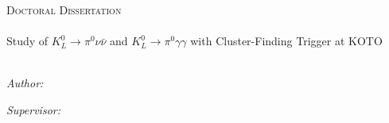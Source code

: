 \documentclass[
11pt, %
english, %
singlespacing, %
nolistspacing, %
liststotoc, %
toctotoc, %
parskip, %
headsepline, %
consistentlayout, %
]{MastersDoctoralThesis} %
\begin{document}
 




\thispagestyle{empty}

\begin{titlepage}
\begin{center}

\vspace*{.06\textheight}
{\scshape\LARGE \univname\par}\vspace{1.5cm} %
\textsc{\Large Doctoral Dissertation}\\[0.5cm] %

\HRule \\[0.4cm] %
{\LARGE %
Study of $K_L^0 \to \pi^0 \nu \bar{\nu}$ and $K_L^0 \to \pi^0 \gamma \gamma$ with Cluster-Finding Trigger at KOTO
\\ }\vspace{0.4cm} %
\HRule \\[1.5cm] %
 
\begin{minipage}[t]{0.4\textwidth}
\begin{flushleft} \Large
\emph{Author:}\\
\href{http://www.johnsmith.com}{\authorname} %
\end{flushleft}

\end{minipage}
\begin{minipage}[t]{0.4\textwidth}
\begin{flushright} \Large
\emph{Supervisor:} \\
\href{http://www.jamessmith.com}{\supname} %
\end{flushright}
\end{minipage}\\[3cm]
 
 

\end{center}
\end{titlepage}
\end{document}
